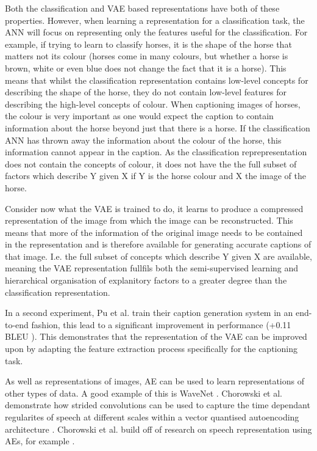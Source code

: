 Both the classification and \ac{VAE} based representations have both of these properties. However, when learning a representation for a classification task, the \ac{ANN} will focus on representing only the features useful for the classification. For example, if trying to learn to classify horses, it is the shape of the horse that matters not its colour (horses come in many colours, but whether a horse is brown, white or even blue does not change the fact that it is a horse). This means that whilst the classification representation contains low-level concepts for describing the shape of the horse, they do not contain low-level features for describing the high-level concepts of colour.
When captioning images of horses, the colour is very important as one would expect the caption to contain information about the horse beyond just that there is a horse. If the classification \ac{ANN} has thrown away the information about the colour of the horse, this information cannot appear in the caption. As the classification reprepresentation does not contain the concepts of colour, it does not have the the full subset of factors which describe Y given X if Y is the horse colour and X the image of the horse.

Consider now what the \ac{VAE} is trained to do, it learns to produce a compressed representation of the image from which the image can be reconstructed. This means that more of the information of the original image needs to be contained in the representation and is therefore available for generating accurate captions of that image. I.e. the full subset of concepts which describe Y given X are available, meaning the \ac{VAE} representation fullfils both the semi-supervised learning and hierarchical organisation of explanitory factors to a greater degree than the classification representation.

In a second experiment, Pu et al. train their caption generation system in an end-to-end fashion, this lead to a significant improvement in performance (+0.11 BLEU \cite{bleu}). This demonstrates that the representation of the \ac{VAE} can be improved upon by adapting the feature extraction process specifically for the captioning task.


As well as representations of images, \ac{AE} can be used to learn representations of other types of data. A good example of this is WaveNet \cite{wavenet}. Chorowski et al. demonstrate how strided convolutions \cite{radford2015unsupervised} can be used to capture the time dependant regularites of speech at different scales within a vector quantised autoencoding architecture \cite{van2017neural}. Chorowski et al. build off of research on speech representation using \acp{AE}, for example \cite{vincent2010stacked, lu2013speech}.

